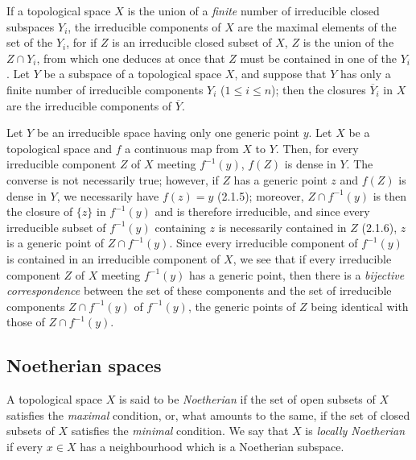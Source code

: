\begin{env}[2.1.7]
\label{0.2.1.7}
If a topological space $X$ is the union of a \emph{finite} number of
irreducible closed subspaces $Y_i$, the irreducible components of $X$
are the maximal elements of the set of the $Y_i$, for if $Z$ is an irreducible
closed subset of $X$, $Z$ is the union of the $Z\cap Y_i$, from which one deduces
at once that $Z$ must be contained in one of the $Y_i$. Let $Y$ be a subspace
of a topological space $X$, and suppose that $Y$ has only a finite number of
irreducible components $Y_i$ ($1\leq i\leq n$); then the closures
$\overline{Y}_i$ in $X$ are the irreducible components of $\overline Y$.
\end{env}

\begin{env}[2.1.8]
\label{0.2.1.8}
Let $Y$ be an irreducible space having only one generic point $y$. Let
$X$ be a topological space and $f$ a continuous map from $X$ to $Y$.
Then, for every irreducible component $Z$ of $X$ meeting $f^{-1}(y)$,
$f(Z)$ is dense in $Y$. The converse is not necessarily true;
however, if $Z$ has a generic point $z$ and $f(Z)$ is dense in
$Y$, we necessarily have $f(z)=y$ (2.1.5); moreover, $Z\cap f^{-1}(y)$ is
then the closure of $\{z\}$ in $f^{-1}(y)$ and is therefore irreducible, and
since every irreducible subset of $f^{-1}(y)$ containing $z$ is
necessarily contained in $Z$ (2.1.6), $z$ is a generic point of
$Z\cap f^{-1}(y)$. Since every irreducible component of $f^{-1}(y)$ is
contained in an irreducible component of $X$, we see that if every
irreducible component $Z$ of $X$ meeting $f^{-1}(y)$ has a generic
point, then there is a \emph{bijective correspondence} between the set of
these components and the set of irreducible components
$Z\cap f^{-1}(y)$ of $f^{-1}(y)$, the generic points of $Z$ being
identical with those of $Z\cap f^{-1}(y)$.
\end{env}


\subsection{Noetherian spaces}
\label{subsection:0.2.2}

\begin{env}[2.2.1]
\label{0.2.2.1}
A topological space $X$ is said to be \emph{Noetherian} if the set of
open subsets of $X$ satisfies the \emph{maximal} condition, or, what amounts to the
same, if the set of closed subsets of $X$ satisfies the \emph{minimal} condition. We
say that $X$ is \emph{locally Noetherian} if every $x\in X$ has a
neighbourhood which is a Noetherian subspace.
\end{env}

